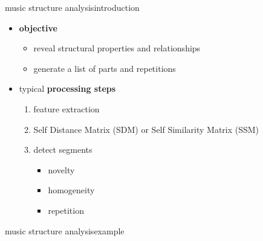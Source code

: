         \begin{frame}{music structure analysis}{introduction}
            \begin{itemize}
                \item   \textbf{objective}
                    \begin{itemize}
                        \item   reveal structural properties and relationships
                        \item   generate a list of parts and repetitions
                    \end{itemize}
                \bigskip
                \item   typical \textbf{processing steps}
                    \begin{enumerate}
                        \item   feature extraction
                        \item   Self Distance Matrix (SDM) or Self Similarity Matrix (SSM)
                        \item   detect segments
                            \begin{itemize}
                                \item novelty
                                \item homogeneity
                                \item repetition
                            \end{itemize}
                    \end{enumerate}
            \end{itemize}
        \end{frame}
        \begin{frame}{music structure analysis}{example}
            {}
        \end{frame}
    
